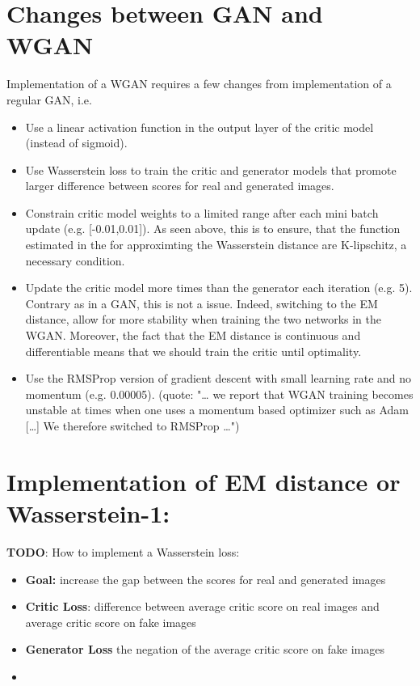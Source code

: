 \documentclass{article}
\begin{document}
\section{Changes between GAN and WGAN}

Implementation of a WGAN requires a few changes from implementation of a regular GAN, i.e. 

\begin{itemize}
    \item Use a linear activation function in the output layer of the critic model (instead of sigmoid).
    \item Use Wasserstein loss to train the critic and generator models that promote larger difference between scores for real and generated images. 
    \item Constrain critic model weights to a limited range after each mini batch update (e.g. [-0.01,0.01]). As seen above, this is to ensure, that the function estimated in the for approximting the Wasserstein distance are K-lipschitz, a necessary condition.
    \item Update the critic model more times than the generator each iteration (e.g. 5). Contrary as in a GAN, this is not a issue. Indeed, switching to the EM distance, allow for more stability when training the two networks in the WGAN. Moreover, the fact that the EM distance is continuous and differentiable means that we should train the critic until optimality.
    \item Use the RMSProp version of gradient descent with small learning rate and no momentum (e.g. 0.00005). (quote: "… we report that WGAN training becomes unstable at times when one uses a momentum based optimizer such as Adam […] We therefore switched to RMSProp …")
    
\end{itemize}
 

\section{Implementation of EM distance or Wasserstein-1:}

\textbf{TODO}: How to implement a Wasserstein loss:

\begin{itemize}
    \item \textbf{Goal:} increase the gap between the scores for real and generated images
    \item \textbf{Critic Loss}: difference between average critic score on real images and average critic score on fake images
    \item \textbf{Generator Loss} the negation of the average critic score on fake images
    \item 
\end{itemize}
\end{document}
